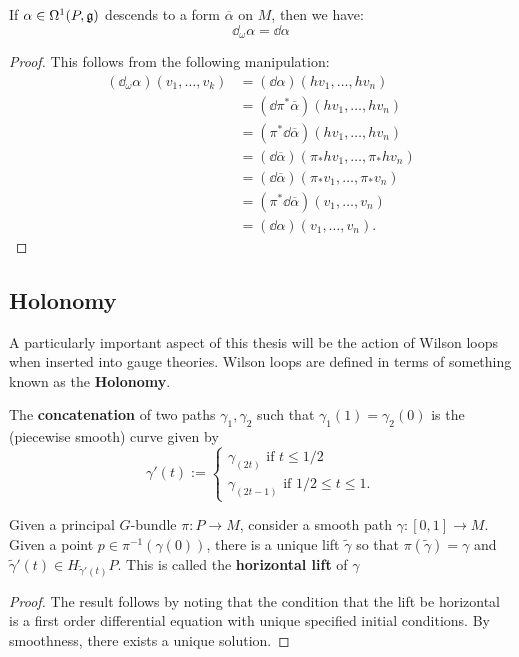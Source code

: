 		\begin{lemma}
			If $\alpha \in \Omega^1 (P, \frak g)$ descends to a form $\overline \alpha$ on $M$, then we have:
			\begin{equation}
				\dd_\omega \alpha = \dd \alpha
			\end{equation}
			\label{lem:pushdown2}
		\end{lemma}
		\begin{proof}
			This follows from the following manipulation:
			\[
				\begin{aligned}
					(\dd_\omega \alpha) (v_1, \dots, v_k) &= (\dd \alpha) (h v_1, \dots, h v_n)\\
					& = (\dd \pi^* \overline \alpha) (h v_1, \dots, h v_n)\\
					& = (\pi^* \dd \overline \alpha) (h v_1, \dots, h v_n)\\
					& = (\dd \overline \alpha) (\pi_* h v_1, \dots, \pi_* h v_n)\\
					& = (\dd \overline \alpha) (\pi_* v_1, \dots, \pi_* v_n)\\
					& = (\pi^* \dd \overline \alpha) (v_1, \dots, v_n)\\
					& = (\dd \alpha) (v_1, \dots, v_n).
				\end{aligned}
			\]
		\end{proof}

		\subsection{Holonomy} %
		\label{sub:holonomy}
		
		
		A particularly important aspect of this thesis will be the action of Wilson loops when inserted into gauge theories. Wilson loops are defined in terms of something known as the \textbf{Holonomy}.
		
		The \textbf{concatenation} of two paths $\gamma_1, \gamma_2$ such that $\gamma_1(1) = \gamma_2(0)$ is the (piecewise smooth) curve given by
		\[
			\gamma'(t) := \begin{cases}
				\gamma_(2t)\text{ if } t \leq 1/2\\
				\gamma_(2t-1) \text{ if } 1/2 \leq t \leq 1.
			\end{cases}
		\]
		
		\begin{prop}
			Given a principal $G$-bundle $\pi:P\to M$, consider a smooth path $\gamma: [0, 1] \to M$. Given a point $p \in \pi^{-1}(\gamma(0))$, there is a unique lift $\tilde \gamma$ so that $\pi(\tilde \gamma) = \gamma$ and $\tilde \gamma'(t) \in H_{\tilde \gamma'(t)}P$. This is called the \textbf{horizontal lift} of $\gamma$
		\end{prop}
		\begin{proof}
			The result follows by noting that the condition that the lift be horizontal is a first order differential equation with unique specified initial conditions. By smoothness, there exists a unique solution.
		\end{proof}
		
